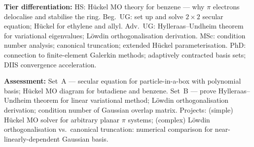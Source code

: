 \documentclass[11pt,a4paper]{article}
\begin{document}
\begin{tcolorbox}[modulebox, title={Module~II.1 / L02: The Linear Variational Method}]
\medskip\textbf{Tier differentiation:}
HS: H\"uckel MO theory for benzene --- why $\pi$ electrons delocalise and stabilise the ring.
Beg.\ UG: set up and solve $2\times 2$ secular equation; H\"uckel for ethylene and allyl.
Adv.\ UG: Hylleraas--Undheim theorem for variational eigenvalues; L\"owdin orthogonalisation derivation.
MSc: condition number analysis; canonical truncation; extended H\"uckel parameterisation.
PhD: connection to finite-element Galerkin methods; adaptively contracted basis sets;
DIIS convergence acceleration.

\medskip\textbf{Assessment:}
Set~A --- secular equation for particle-in-a-box with polynomial basis;
H\"uckel MO diagram for butadiene and benzene.
Set~B --- prove Hylleraas--Undheim theorem for linear variational method;
L\"owdin orthogonalisation derivation; condition number of Gaussian overlap matrix.
Projects: (simple) H\"uckel MO solver for arbitrary planar $\pi$ systems;
(complex) L\"owdin orthogonalisation vs.\ canonical truncation: numerical comparison
for near-linearly-dependent Gaussian basis.
\end{tcolorbox}

\medskip
\end{document}
